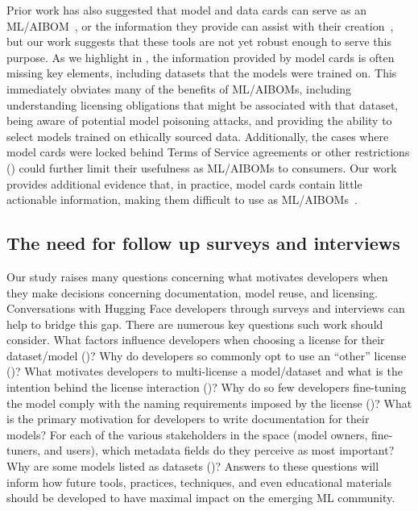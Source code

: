 Prior work has also suggested that model and data cards can serve as an ML/AIBOM~\cite{stalnaker2024boms}, or the information they provide can assist with their creation~\cite{xia2023trust, pepe2024hugging}, but our work suggests that these tools are not yet robust enough to serve this purpose. As we highlight in , the information provided by model cards is often missing key elements, including datasets that the models were trained on. This immediately obviates many of the benefits of ML/AIBOMs, including understanding licensing obligations that might be associated with that dataset, being aware of potential model poisoning attacks, and providing the ability to select models trained on ethically sourced data. Additionally, the cases where model cards were locked behind Terms of Service agreements or other restrictions () could further limit their usefulness as ML/AIBOMs to consumers. Our work provides additional evidence that, in practice, model cards contain little actionable information, making them difficult to use as ML/AIBOMs~\cite{bhat2023aspirations}.

\subsection{The need for follow up surveys and interviews}
Our study raises many questions concerning what motivates developers when they make decisions concerning documentation, model reuse, and licensing.  %
Conversations with Hugging Face developers through surveys and interviews can help to bridge this gap.  There are numerous key questions such work should consider. What factors influence developers when choosing a license for their dataset/model ()? Why do developers so commonly opt to use an ``other'' license ()? What motivates developers to multi-license a model/dataset and what is the intention behind the license interaction ()?  Why do so few developers fine-tuning the  model comply with the naming requirements imposed by the  license ()? What is the primary motivation for developers to write documentation for their models?  For each of the various stakeholders in the space (model owners, fine-tuners, and users), which metadata fields do they perceive as most important?  Why are some models listed as datasets ()? Answers to these questions will inform how future tools, practices, techniques, and even educational materials should be developed to have maximal impact on the emerging ML community. %


